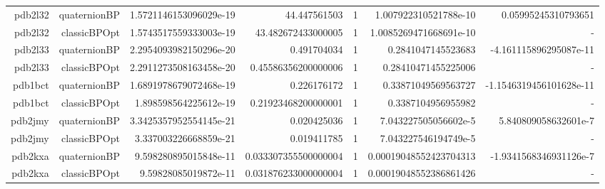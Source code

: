 \documentclass[a4paper,10pt]{article}
\begin{document}
{{\begin{tabular}{rrrrrrr}
pdb2l32 & quaternionBP & 1.5721146153096029e-19 & 44.447561503 & 1 & 1.007922310521788e-10 & 0.05995245310793651 \\
pdb2l32 & classicBPOpt & 1.5743517559333003e-19 & 43.482672433000005 & 1 & 1.0085269471668691e-10 &  -  \\
pdb2l33 & quaternionBP & 2.2954093982150296e-20 & 0.491704034 & 1 & 0.2841047145523683 & -4.161115896295087e-11 \\
pdb2l33 & classicBPOpt & 2.2911273508163458e-20 & 0.45586356200000006 & 1 & 0.28410471455225006 &  -  \\
pdb1bct & quaternionBP & 1.6891978679072468e-19 & 0.226176172 & 1 & 0.33871049569563727 & -1.1546319456101628e-11 \\
pdb1bct & classicBPOpt & 1.898598564225612e-19 & 0.21923468200000001 & 1 & 0.3387104956955982 &  -  \\
pdb2jmy & quaternionBP & 3.3425357952554145e-21 & 0.020425036 & 1 & 7.043227505056602e-5 & 5.840809058632601e-7 \\
pdb2jmy & classicBPOpt & 3.337003226668859e-21 & 0.019411785 & 1 & 7.043227546194749e-5 &  -  \\
pdb2kxa & quaternionBP & 9.598280895015848e-11 & 0.033307355500000004 & 1 & 0.00019048552423704313 & -1.9341568346931126e-7 \\
pdb2kxa & classicBPOpt & 9.59828085019872e-11 & 0.031876233000000004 & 1 & 0.00019048552386861426 &  -  \\\hline\hline
\end{tabular}
}

}
\end{document}
